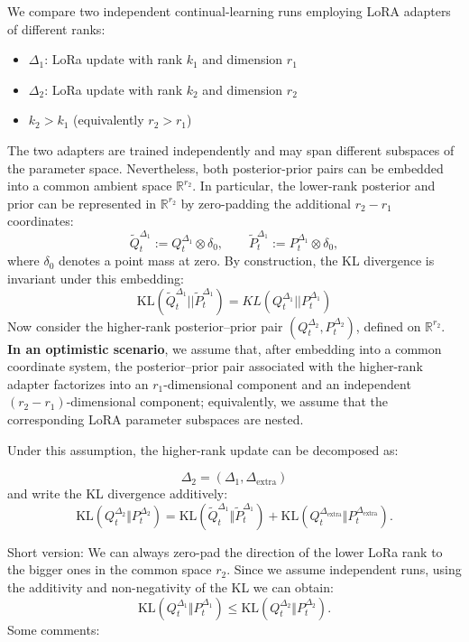 \documentclass{article}
\theoremstyle{plain}
\theoremstyle{definition}
\theoremstyle{remark}
\begin{document}
We compare two independent continual-learning runs employing LoRA adapters
of different ranks:
\begin{itemize}
    \item $\Delta_1$: LoRa update with rank $k_1$ and dimension $r_1$
    \item $\Delta_2$: LoRa update with rank $k_2$ and dimension $r_2$
    \item $k_2 > k_1$ (equivalently $r_2 > r_1$)
\end{itemize}
The two adapters are trained independently and may span different subspaces of the parameter space. 
Nevertheless, both posterior-prior pairs can be embedded into a common ambient space $\mathbb{R}^{r_2}$. In particular, the lower-rank posterior and prior can be represented in $\mathbb{R}^{r_2}$ by zero-padding the additional $r_2 - r_1$ coordinates:
\[
\tilde Q_t^{\Delta_1} := Q_t^{\Delta_1} \otimes \delta_0,
\qquad
\tilde P_t^{\Delta_1} := P_t^{\Delta_1} \otimes \delta_0,
\]
where $\delta_0$ denotes a point mass at zero. By construction, the KL divergence is invariant under this embedding:
\begin{equation}
      \mathrm{KL}(\tilde{Q}_t^{\Delta_1} || \tilde{P}_t^{\Delta_1}) = KL(Q_t^{\Delta_1}||P_t^{\Delta_1})
\end{equation}
Now consider the higher-rank posterior--prior pair
\((Q_t^{\Delta_2}, P_t^{\Delta_2})\), defined on \(\mathbb{R}^{r_2}\). \textbf{In an optimistic scenario}, we assume that, after embedding into a common
coordinate system, the posterior--prior pair associated with the
higher-rank adapter factorizes into an $r_1$-dimensional component and an
independent $(r_2 - r_1)$-dimensional component; equivalently, we assume
that the corresponding LoRA parameter subspaces are nested.

Under this assumption, the higher-rank update can be decomposed as: 
 
\[
\Delta_2 = (\Delta_1, \Delta_{\mathrm{extra}})
\]
and write the KL divergence additively:
\begin{equation}
\label{eq:kl_additivity_lora}
\mathrm{KL}(Q_t^{\Delta_2} \Vert P_t^{\Delta_2})
=
\mathrm{KL}(\tilde Q_t^{\Delta_1} \Vert \tilde P_t^{\Delta_1})
+
\mathrm{KL}(Q_t^{\Delta_{\mathrm{extra}}} \Vert P_t^{\Delta_{\mathrm{extra}}}).
\end{equation}

Short version: We can always zero-pad the direction of the lower LoRa rank to the bigger ones in the common space $r_2$. Since we assume independent runs, using the additivity and non-negativity of the KL we can obtain:
\begin{equation}
    \mathrm{KL}(Q_t^{\Delta_1} \Vert P_t^{\Delta_1})
\le
\mathrm{KL}(Q_t^{\Delta_2} \Vert P_t^{\Delta_2}).
\end{equation}
Some comments:
\end{document}

